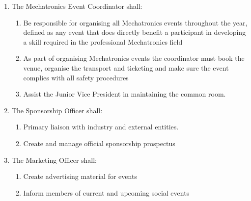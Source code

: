 \documentclass[11pt]{article}
\begin{document}
\begin{enumerate}[\thesection .1]
\begin{enumerate}
    \end{enumerate}
    \item The Mechatronics Event Coordinator shall:
    \begin{enumerate}
        \item Be responsible for organising all Mechatronics events throughout the year, defined as any event that does directly benefit a participant in developing a skill required in the professional Mechatronics field
        \item As part of organising Mechatronics events the coordinator must book the venue, organise the transport and ticketing and make sure the event complies with all safety procedures
        \item Assist the Junior Vice President in maintaining the common room.	
    \end{enumerate}
    \item The Sponsorship Officer shall:
    \begin{enumerate}
        \item Primary liaison with industry and external entities.
        \item Create and manage official sponsorship prospectus
    \end{enumerate}
    \item The Marketing Officer shall:
    \begin{enumerate}
        \item Create advertising material for events
        \item Inform members of current and upcoming social events
    \end{enumerate}
\end{enumerate}
\end{document}

